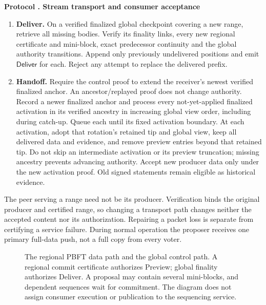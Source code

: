 \documentclass[11pt,a4paper,onecolumn]{article}
\newcommand{\Tag}[1]{\mathsf{#1}}
\theoremstyle{remark}\newtheorem{example}[definition]{Example}
\newcounter{protocol}
\newenvironment{protocol}[2]{\refstepcounter{protocol}\label{#1}\begin{mdframed}[nobreak=true,linewidth=.6pt,skipabove=10pt,skipbelow=10pt,innertopmargin=8pt,innerbottommargin=8pt]\small\raggedright\noindent\textbf{Protocol \theprotocol. #2}\par\smallskip}{\end{mdframed}}
\begin{document}
\begin{protocol}{alg:pull}{Stream transport and consumer acceptance}
\begin{enumerate}[label=\textbf{D\arabic*.}]
activation proof authorizes the receiver's current global view and its fixed
activation time has been reached. Append verified positions in order
to the preview suffix and emit $\Tag{Preview}$. Missing predecessors prevent
output. Stop extending an old global view after learning its finalized successor.
\item \textbf{Deliver.} On a verified finalized global checkpoint covering a
new range, retrieve all missing bodies. Verify its finality links, every new
regional certificate and mini-block, exact predecessor continuity and the global
authority transitions. Append only previously undelivered positions and emit
$\Tag{Deliver}$ for each. Reject any attempt to replace the delivered prefix.
\item \textbf{Handoff.} Require the control proof to extend the receiver's
newest verified finalized anchor. An ancestor/replayed proof does not change
authority. Record a newer finalized anchor and process every not-yet-applied
finalized activation in its verified ancestry in increasing global view order,
including during catch-up. Queue each until its fixed activation boundary.
At each activation, adopt that rotation's retained tip and global view, keep all
delivered data and evidence, and remove preview entries beyond that retained tip.
Do not skip an intermediate activation or its preview truncation; missing
ancestry prevents advancing authority. Accept new producer data only under
the new activation proof.
Old signed statements remain eligible as historical evidence.
\end{enumerate}
\end{protocol}

The peer serving a range need not be its producer. Verification binds the
original producer and certified range, so changing a transport path changes
neither the accepted content nor its authorization. Repairing a packet loss
is separate from certifying a service failure. During normal operation the
proposer receives one primary full-data push, not a full copy from every voter.

\begin{figure}[htbp]\centering

\caption{The regional PBFT data path and the global control path. A regional
commit certificate authorizes Preview; global finality authorizes Deliver.
A proposal may contain several mini-blocks, and dependent sequences wait for
commitment. The diagram does not assign consumer execution or publication to
the sequencing service.}
\label{fig:stream}
\end{figure}
\end{document}
